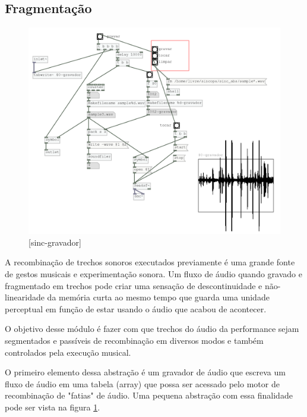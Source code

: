 \documentclass{ppgmus}
\begin{document}
\subsection {Fragmentação}


\begin{figure}
\includegraphics[scale=.6]{sinc-gravador}
\caption{[sinc-gravador]}
\label{sinc-gravador}
\end{figure}



A recombinação de trechos sonoros executados previamente é uma grande fonte
de gestos musicais e experimentação sonora. Um fluxo de áudio quando gravado
e fragmentado em trechos pode criar uma sensação de descontinuidade e não-linearidade
da memória curta ao mesmo tempo que guarda uma unidade perceptual em função de estar usando
o áudio que acabou de acontecer.

O objetivo desse módulo é fazer com que trechos do áudio da performance sejam segmentados e 
passíveis de recombinação em diversos modos e também controlados pela execução musical.

O primeiro elemento dessa abstração é um gravador de áudio que escreva um fluxo
de áudio em uma tabela (array) que possa ser acessado pelo motor de recombinação de "fatias" de áudio.
Uma pequena abstração com essa finalidade pode ser vista na figura \ref{sinc-gravador}.
\end{document}
